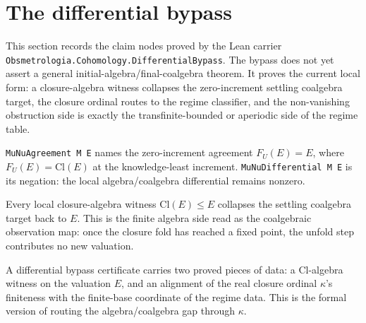 \section{The differential bypass}

This section records the claim nodes proved by the Lean carrier
\texttt{Obsmetrologia.Cohomology.DifferentialBypass}.  The bypass does not yet
assert a general initial-algebra/final-coalgebra theorem.  It proves the
current local form: a closure-algebra witness collapses the zero-increment
settling coalgebra target, the closure ordinal routes to the regime classifier,
and the non-vanishing obstruction side is exactly the transfinite-bounded or
aperiodic side of the regime table.

\begin{proposition}\label{thm:munu-agreement-differential}\leanok{}
\texttt{MuNuAgreement M E} names the zero-increment agreement
\(F_U(E)=E\), where \(F_U(E)=\mathrm{Cl}(E)\) at the knowledge-least
increment.  \texttt{MuNuDifferential M E} is its negation: the local
algebra/coalgebra differential remains nonzero.
\end{proposition}

\begin{theorem}\label{thm:coalgebra-dual-of-algebra}\leanok{}
Every local closure-algebra witness \(\mathrm{Cl}(E)\leq E\) collapses the
settling coalgebra target back to \(E\).  This is the finite algebra side read
as the coalgebraic observation map: once the closure fold has reached a fixed
point, the unfold step contributes no new valuation.
\end{theorem}

\begin{proposition}\label{thm:differential-bypass}\leanok{}
A differential bypass certificate carries two proved pieces of data: a
\(\mathrm{Cl}\)-algebra witness on the valuation \(E\), and an alignment of the
real closure ordinal \(\kappa\)'s finiteness with the finite-base coordinate of
the regime data.  This is the formal version of routing the algebra/coalgebra
gap through \(\kappa\).
\end{proposition}

